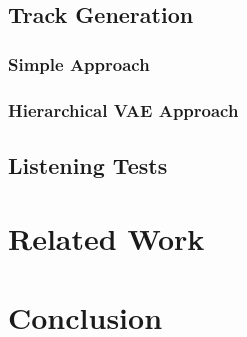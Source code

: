 \documentclass[10pt,twocolumn]{article}
\begin{document}
\subsection{Track Generation}
\subsubsection{Simple Approach}
\subsubsection{Hierarchical VAE Approach}

\subsection{Listening Tests}

\section{Related Work}

\section{Conclusion}

\pagebreak






\end{document}
